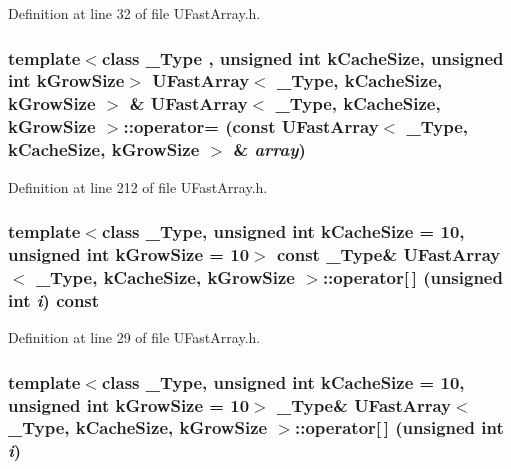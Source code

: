 Definition at line 32 of file UFastArray.h.\hypertarget{class_u_fast_array_91c515426b0745d5ed8b453aa410a738}{
\subsubsection[{operator=}]{\setlength{\rightskip}{0pt plus 5cm}template$<$class \_\-Type , unsigned int kCacheSize, unsigned int kGrowSize$>$ {\bf UFastArray}$<$ \_\-Type, kCacheSize, kGrowSize $>$ \& {\bf UFastArray}$<$ \_\-Type, kCacheSize, kGrowSize $>$::operator= (const {\bf UFastArray}$<$ \_\-Type, kCacheSize, kGrowSize $>$ \& {\em array})}}
\label{class_u_fast_array_91c515426b0745d5ed8b453aa410a738}




Definition at line 212 of file UFastArray.h.\hypertarget{class_u_fast_array_831daf82a5330a255728bf6236d31eb1}{
\subsubsection[{operator[]}]{\setlength{\rightskip}{0pt plus 5cm}template$<$class \_\-Type, unsigned int kCacheSize = 10, unsigned int kGrowSize = 10$>$ const \_\-Type\& {\bf UFastArray}$<$ \_\-Type, kCacheSize, kGrowSize $>$::operator\mbox{[}$\,$\mbox{]} (unsigned int {\em i}) const}}
\label{class_u_fast_array_831daf82a5330a255728bf6236d31eb1}




Definition at line 29 of file UFastArray.h.\hypertarget{class_u_fast_array_47585b9f9bceaca22c294f2e961aa693}{
\subsubsection[{operator[]}]{\setlength{\rightskip}{0pt plus 5cm}template$<$class \_\-Type, unsigned int kCacheSize = 10, unsigned int kGrowSize = 10$>$ \_\-Type\& {\bf UFastArray}$<$ \_\-Type, kCacheSize, kGrowSize $>$::operator\mbox{[}$\,$\mbox{]} (unsigned int {\em i})}}
\label{class_u_fast_array_47585b9f9bceaca22c294f2e961aa693}




